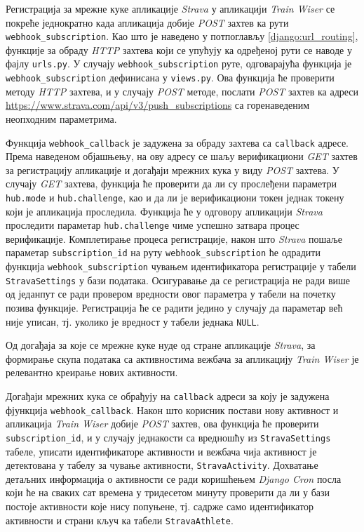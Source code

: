 \documentclass[12pt,oneside]{memoir}
\begin{document}
Регистрација за мрежне куке апликације \textit{Strava} у апликацији \textit{Train Wiser} се покреће једнократно када апликација добије \textit{POST} захтев ка рути \\ \texttt{webhook\_subscription}. Као што је наведено у потпоглављу \ref{django:url_routing}, функције за обраду \textit{HTTP} захтева који се упућују ка одређеној рути се наводе у фајлу \texttt{urls.py}. У случају \texttt{webhook\_subscription} руте, одговарајућа функција је \texttt{webhook\_subscription} дефинисана у \texttt{views.py}. Ова функција ће проверити методу \textit{HTTP} захтева, и у случају \textit{POST} методе, послати \textit{POST} захтев ка адреси \url{https://www.strava.com/api/v3/push_subscriptions} са горенаведеним неопходним параметрима.

Функција \texttt{webhook\_callback} је задужена за обраду захтева са \texttt{callback} адресе. Према наведеном објашњењу, на ову адресу се шаљу верификациони \textit{GET} захтев за регистрацију апликације и догађаји мрежних кука у виду \textit{POST} захтева. У случају \textit{GET} захтева, функција ће проверити да ли су прослеђени параметри \texttt{hub.mode} и \texttt{hub.challenge}, као и да ли је верификациони токен једнак токену који је апликација проследила. Функција ће у одговору апликацији \textit{Strava} проследити параметар \texttt{hub.challenge} чиме успешно затвара процес верификације. Комплетирање процеса регистрације, након што \textit{Strava} пошаље параметар \texttt{subscription\_id} на руту \texttt{webhook\_subscription} ће одрадити функција \texttt{webhook\_subscription} чувањем идентификатора регистрације у табели \texttt{StravaSettings} у бази података. Осигуравање да се регистрација не ради више од једанпут се ради провером вредности овог параметра у табели на почетку позива функције. Регистрација ће се радити једино у случају да параметар већ није уписан, тј. уколико је вредност у табели једнака \texttt{NULL}.

Од догађаја за које се мрежне куке нуде од стране апликације \textit{Strava}, за формирање скупа података са активностима вежбача за апликацију \textit{Train Wiser} је релевантно креирање нових активности. 

Догађаји мрежних кука се обрађују на \texttt{callback} адреси за коју је задужена фјункција \texttt{webhook\_callback}. Након што корисник постави нову активност и апликација \textit{Train Wiser} добије \textit{POST} захтев, ова функција ће проверити \texttt{subscription\_id}, и у случају једнакости са вредношћу из \texttt{StravaSettings} табеле, уписати идентификаторе активности и вежбача чија активност је детектована у табелу за чување активности, \texttt{StravaActivity}. Дохватање детаљних информација о активности се ради коришћењем \textit{Django Cron} посла који ће на сваких сат времена у тридесетом минуту проверити да ли у бази постоје активности које нису попуњене, тј. садрже само идентификатор активности и страни кључ ка табели \texttt{StravaAthlete}. 
\end{document}
